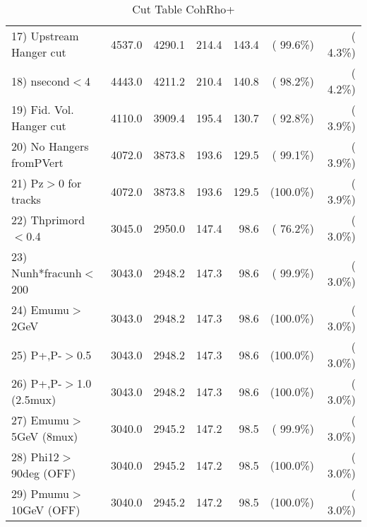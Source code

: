 \begin{table}[h!]
\begin{tabular}{||l||r|r|r|r|r|r||}
 17) Upstream Hanger cut  &       4537.0 &       4290.1 &        214.4 &        143.4 & ( 99.6\%) & (  4.3\%) \\
 18) nsecond$<$4          &       4443.0 &       4211.2 &        210.4 &        140.8 & ( 98.2\%) & (  4.2\%) \\
 19) Fid. Vol. Hanger cut &       4110.0 &       3909.4 &        195.4 &        130.7 & ( 92.8\%) & (  3.9\%) \\
 20) No Hangers fromPVert &       4072.0 &       3873.8 &        193.6 &        129.5 & ( 99.1\%) & (  3.9\%) \\
 21) Pz$>$0 for tracks    &       4072.0 &       3873.8 &        193.6 &        129.5 & (100.0\%) & (  3.9\%) \\
 22) Thprimord$<$0.4      &       3045.0 &       2950.0 &        147.4 &         98.6 & ( 76.2\%) & (  3.0\%) \\
 23) Nunh*fracunh$<$200   &       3043.0 &       2948.2 &        147.3 &         98.6 & ( 99.9\%) & (  3.0\%) \\
 24) Emumu$>$2GeV         &       3043.0 &       2948.2 &        147.3 &         98.6 & (100.0\%) & (  3.0\%) \\
 25) P+,P-$>$0.5          &       3043.0 &       2948.2 &        147.3 &         98.6 & (100.0\%) & (  3.0\%) \\
 26) P+,P-$>$1.0 (2.5mux) &       3043.0 &       2948.2 &        147.3 &         98.6 & (100.0\%) & (  3.0\%) \\
 27) Emumu$>$5GeV  (8mux) &       3040.0 &       2945.2 &        147.2 &         98.5 & ( 99.9\%) & (  3.0\%) \\
 28) Phi12$>$90deg  (OFF) &       3040.0 &       2945.2 &        147.2 &         98.5 & (100.0\%) & (  3.0\%) \\
 29) Pmumu$>$10GeV  (OFF) &       3040.0 &       2945.2 &        147.2 &         98.5 & (100.0\%) & (  3.0\%) \\
 \hline
 \hline
 \end{tabular}
 \caption{Cut Table  CohRho+  }
 \label{tab-cutcohjpsi-mumu_cohrhop}
 \end{table}

